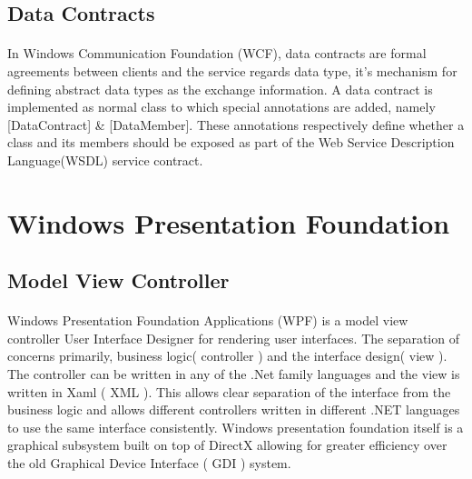 		\subsection{Data Contracts}
		\vspace{5mm}
		\begin{multicols}{2}
		\paragraph{}
		
		In Windows Communication Foundation (WCF), data contracts are formal agreements between clients and the service regards data type, it's 
		mechanism for defining	abstract data types as the exchange information.
		A data contract is implemented as normal class to which special annotations are added, namely [DataContract] \& [DataMember].  These annotations
		respectively define whether a class and its members should be exposed as part of the Web Service Description Language(WSDL) service contract. 

		\end{multicols}
		
	\section{Windows Presentation Foundation}
		\subsection{Model View Controller}
		\vspace{5mm}
		\begin{multicols}{2}
		\paragraph{}
		
		Windows Presentation Foundation Applications (WPF) is a model view controller User Interface Designer for rendering user interfaces.
		The separation of concerns primarily, business logic( controller ) and the interface design( view ).  The controller can be written
		in any of the .Net family languages and the view is written in Xaml ( XML ).  This allows clear separation of the interface from the business logic
		and allows different controllers written in different .NET languages to use the same interface consistently.
		Windows presentation foundation itself is a graphical subsystem built on top of DirectX allowing for greater efficiency over the old Graphical 
		Device Interface ( GDI ) system. 

		\end{multicols}
		
